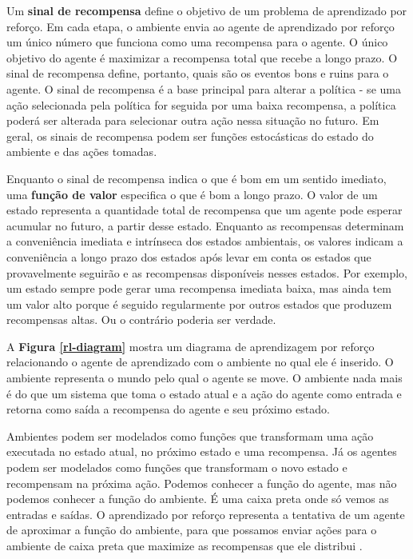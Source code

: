 Um \textbf{sinal de recompensa} define o objetivo de um problema de aprendizado por reforço. 
Em cada etapa, o ambiente envia ao agente de aprendizado por reforço um único número que funciona como uma recompensa para o agente. 
O único objetivo do agente é maximizar a recompensa total que recebe a longo prazo.
O sinal de recompensa define, portanto, quais são os eventos bons e ruins para o agente. 
O sinal de recompensa é a base principal para alterar a política - se uma ação selecionada pela política for seguida por uma baixa recompensa, a política poderá ser alterada para selecionar outra ação nessa situação no futuro. 
Em geral, os sinais de recompensa podem ser funções estocásticas do estado do ambiente e das ações tomadas.

Enquanto o sinal de recompensa indica o que é bom em um sentido imediato, uma \textbf{função de valor} especifica o que é bom a longo prazo. 
O valor de um estado representa a quantidade total de recompensa que um agente pode esperar acumular no futuro, a partir desse estado. 
Enquanto as recompensas determinam a conveniência imediata e intrínseca dos estados ambientais, os valores indicam a conveniência a longo prazo dos estados após levar em conta os estados que provavelmente seguirão e as recompensas disponíveis nesses estados. 
Por exemplo, um estado sempre pode gerar uma recompensa imediata baixa, mas ainda tem um valor alto porque é seguido regularmente por outros estados que produzem recompensas altas. Ou o contrário poderia ser verdade. 

A \textbf{Figura \ref{rl-diagram}} mostra um diagrama de aprendizagem por reforço relacionando o agente de aprendizado com o ambiente no qual ele é inserido.
O ambiente representa o mundo pelo qual o agente se move. O ambiente nada mais é do que um sistema que toma o estado atual e a ação do agente como entrada e retorna como saída a recompensa do agente e seu próximo estado. 

Ambientes podem ser modelados como funções que transformam uma ação executada no estado atual, no próximo estado e uma recompensa. Já os agentes podem ser modelados como funções que transformam o novo estado e recompensam na próxima ação. 
Podemos conhecer a função do agente, mas não podemos conhecer a função do ambiente. É uma caixa preta onde só vemos as entradas e saídas. 
O aprendizado por reforço representa a tentativa de um agente de aproximar a função do ambiente, para que possamos enviar ações para o ambiente de caixa preta que maximize as recompensas que ele distribui \cite{beg-guide-rl}.

